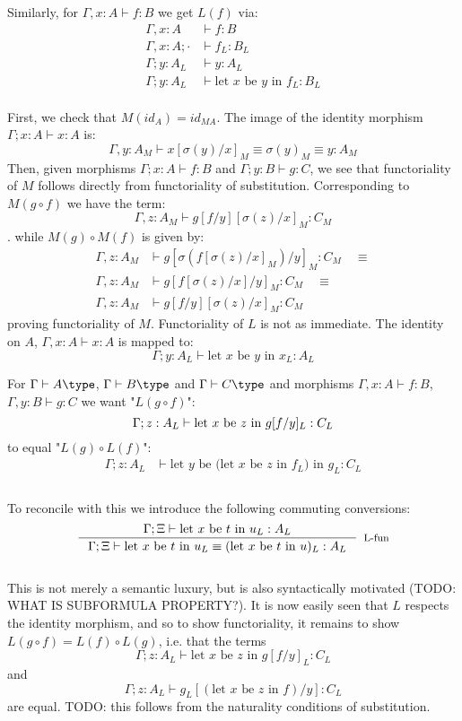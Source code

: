 Similarly, for $\Gamma, x : A \vdash f : B$ we get $L(f)$ via:
\[
  \begin{split}
    \Gamma, x : A &\vdash f : B\\
    \Gamma, x : A; \cdot &\vdash f_L : B_L\\
    \Gamma; y : A_L &\vdash y : A_L\\
    \Gamma; y : A_L &\vdash \text{let $x$ be $y$ in $f_L$} : B_L
  \end{split}
\]\\
First, we check that $M(id_A) = id_{MA}$.  The image of the identity morphism $\Gamma; x : A \vdash x : A$ is:
\[
  \Gamma, y : A_M \vdash x[\sigma(y)/x]_M \equiv \sigma(y)_M \equiv y : A_M
\]
Then, given morphisms $\Gamma; x : A \vdash f : B$ and $\Gamma; y : B \vdash g : C$, we see that functoriality of $M$ follows directly from functoriality of substitution. Corresponding to $M(g \circ f)$ we have the term:
\[
\Gamma, z : A_M \vdash g[f/y][\sigma(z)/x]_M : C_M
\].
while $M(g) \circ M(f)$ is given by:
\[
  \begin{split}
    \Gamma, z : A_M &\vdash g[\sigma(f[\sigma(z)/x]_M)/y]_M : C_M \quad \equiv\\
    \Gamma, z : A_M &\vdash g[f[\sigma(z)/x]/y]_M : C_M \quad \equiv\\
    \Gamma, z : A_M &\vdash g[f/y][\sigma(z)/x]_M : C_M
  \end{split}
\]
proving functoriality of $M$.
Functoriality of $L$ is not as immediate. The identity on $A$, $\Gamma, x : A \vdash x : A$ is mapped to:
\[
  \Gamma; y : A_L \vdash \text{let $x$ be $y$ in $x_L$} : A_L
\]



For $\Gamma \vdash A \type$, $\Gamma \vdash B \type$ and $\Gamma \vdash C \type$ and morphisms $\Gamma, x : A \vdash f : B$, $\Gamma, y : B \vdash g : C$ we want "$L(g \circ f)$":
\[
  \Gamma; z : A_L \vdash \text{let $x$ be $z$ in $g[f/y]_L$} : C_L\\
\]
to equal "$L(g) \circ L(f)$":
\[
  \begin{split}
    \Gamma; z : A_L &\vdash \text{let $y$ be (let $x$ be $z$ in $f_L$) in $g_L$} : C_L\\
  \end{split}
\]\\
To reconcile with this we introduce the following commuting conversions:
\[
\inference{\Gamma; \Xi \vdash \text{let $x$ be $t$ in $u_L$} : A_L}{\Gamma; \Xi \vdash \text{let $x$ be $t$ in $u_L$} \equiv (\text{let $x$ be $t$ in $u$})_L : A_L}[L-fun]
\]\\
This is not merely a semantic luxury, but is also syntactically motivated (TODO: WHAT IS SUBFORMULA PROPERTY?). It is now easily seen that $L$ respects the identity morphism, and so to show functoriality, it remains to show $L(g \circ f) = L(f) \circ L(g)$, i.e. that the terms
\[
  \Gamma; z : A_L \vdash \text{let $x$ be $z$ in }g[f/y]_L : C_L
\]
and
\[
  \Gamma; z : A_L \vdash g_L[(\text{let $x$ be $z$ in }f)/y] : C_L
\]
are equal. TODO: this follows from the naturality conditions of substitution.

